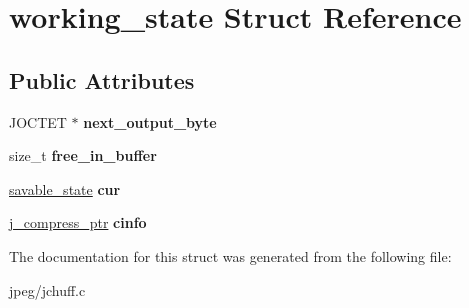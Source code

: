 \hypertarget{structworking__state}{}\section{working\+\_\+state Struct Reference}
\label{structworking__state}
\subsection*{Public Attributes}
\begin{DoxyCompactItemize}
\item 
J\+O\+C\+T\+ET $\ast$ {\bfseries next\+\_\+output\+\_\+byte}\hypertarget{structworking__state_aa672d560261c7d8bb78f4014489f9661}{}\label{structworking__state_aa672d560261c7d8bb78f4014489f9661}

\item 
size\+\_\+t {\bfseries free\+\_\+in\+\_\+buffer}\hypertarget{structworking__state_a2a369c125a91f2aaebbb71ab52e37e7e}{}\label{structworking__state_a2a369c125a91f2aaebbb71ab52e37e7e}

\item 
\hyperlink{structsavable__state}{savable\+\_\+state} {\bfseries cur}\hypertarget{structworking__state_a9a55a26239810c0d5ec42c165ee74101}{}\label{structworking__state_a9a55a26239810c0d5ec42c165ee74101}

\item 
\hyperlink{structjpeg__compress__struct}{j\+\_\+compress\+\_\+ptr} {\bfseries cinfo}\hypertarget{structworking__state_ae54d796ba9c39bb85a922db336e3157b}{}\label{structworking__state_ae54d796ba9c39bb85a922db336e3157b}

\end{DoxyCompactItemize}


The documentation for this struct was generated from the following file\+:\begin{DoxyCompactItemize}
\item 
jpeg/jchuff.\+c\end{DoxyCompactItemize}

